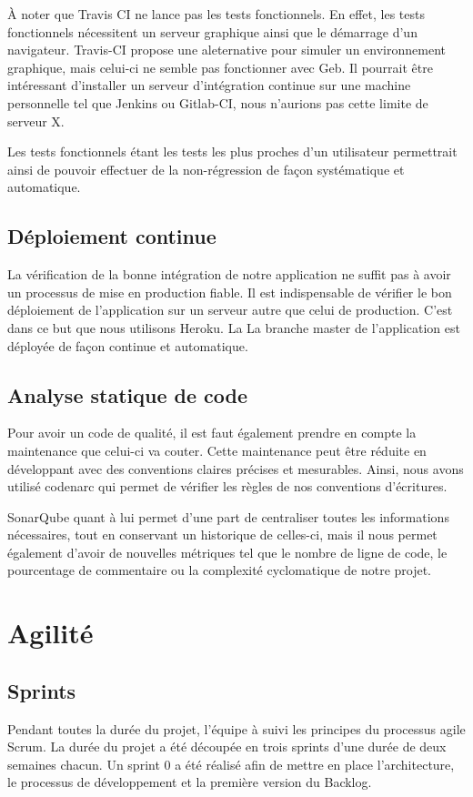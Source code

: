 \documentclass[12pt,a4paper,oneside]{book}
\begin{document}
	\begin{exemple}
	À noter que Travis CI ne lance pas les tests fonctionnels. En effet, les tests fonctionnels nécessitent un serveur graphique
	ainsi que le démarrage d’un navigateur. Travis-CI propose une aleternative pour simuler un environnement graphique, mais
	celui-ci ne semble pas fonctionner avec Geb. Il pourrait être intéressant d'installer un serveur d’intégration continue sur une
	machine personnelle tel que Jenkins ou Gitlab-CI, nous n'aurions pas cette limite de serveur X.
	\end{exemple}

	Les tests fonctionnels étant les tests les plus proches d’un utilisateur permettrait ainsi de pouvoir effectuer de la non-régression de façon systématique et automatique.
	
	\section{Déploiement continue}
	La vérification de la bonne intégration de notre application ne suffit pas à avoir un processus de mise en production fiable. Il est indispensable de vérifier le bon déploiement de l'application sur un serveur autre que celui de production. C'est dans ce but que nous utilisons Heroku. La La branche master de l'application est déployée de façon continue et automatique.
	
	\section{Analyse statique de code}
	Pour avoir un code de qualité, il est faut également prendre en compte la maintenance que celui-ci va couter. Cette maintenance peut être réduite en développant avec des conventions claires précises et mesurables. 
	Ainsi, nous avons utilisé codenarc qui permet de vérifier les règles de nos conventions d’écritures. 
	
	SonarQube quant à lui permet d’une part de centraliser toutes les informations nécessaires, tout en conservant un historique de celles-ci, mais il nous permet également d’avoir de nouvelles métriques tel que le nombre de ligne de code, le pourcentage de commentaire ou la complexité cyclomatique de notre projet. 
	
	\chapter{Agilité}
	\section{Sprints}	
	Pendant toutes la durée du projet, l’équipe à suivi les principes du processus agile Scrum. La durée du projet a été découpée en trois sprints d’une durée de deux semaines chacun. Un sprint 0 a été réalisé afin de mettre en place l’architecture, le processus de développement et la première version du Backlog.
	
\end{document}
